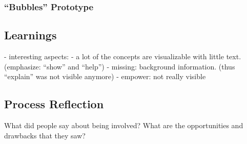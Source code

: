 \subsubsection{``Bubbles'' Prototype}

\subsection{Learnings}

- interesting aspects:
	- a lot of the concepts are visualizable with little text. (emphasize: ``show'' and ``help'')
	- missing: background information. (thus ``explain'' was not visible anymore)
	- empower: not really visible
	

\subsection{Process Reflection}
What did people say about being involved? What are the opportunities and drawbacks that they saw?




%
%
